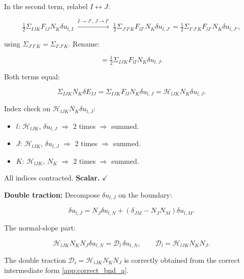 \documentclass[11pt]{article}
\begin{document}
In the second term, relabel $I\leftrightarrow J$:

\begin{equation}
\tfrac{1}{2}\Sigma_{IJK}F_{lJ}N_K\delta u_{l,I}
\;\xrightarrow{I\to J',\,J\to I'}\;
\tfrac{1}{2}\Sigma_{J'I'K}F_{lI'}N_K\delta u_{l,J'}
= \tfrac{1}{2}\Sigma_{I'J'K}F_{lI'}N_K\delta u_{l,J'},
\end{equation}

using $\Sigma_{J'I'K}=\Sigma_{I'J'K}$. Rename:

\begin{equation}
= \tfrac{1}{2}\Sigma_{IJK}F_{lI}N_K\delta u_{l,J}.
\end{equation}

Both terms equal:

\begin{equation}
\Sigma_{IJK}N_K\delta E_{IJ}
= \Sigma_{IJK}F_{lI}N_K\delta u_{l,J}
= \mathcal{H}_{lJK}N_K\delta u_{l,J}.
\label{app:correct_bnd_a}
\end{equation}

Index check on $\mathcal{H}_{lJK}N_K\delta u_{l,J}$:

\begin{itemize}
\item $l$: $\mathcal{H}_{lJK}$, $\delta u_{l,J}$ $\Rightarrow$ 2 times $\Rightarrow$ summed.
\item $J$: $\mathcal{H}_{lJK}$, $\delta u_{l,J}$ $\Rightarrow$ 2 times $\Rightarrow$ summed.
\item $K$: $\mathcal{H}_{lJK}$, $N_K$ $\Rightarrow$ 2 times $\Rightarrow$ summed.
\end{itemize}

All indices contracted. \textbf{Scalar.} $\checkmark$

\textbf{Double traction:} Decompose $\delta u_{l,J}$ on the boundary:

\begin{equation}
\delta u_{l,J} = N_J\delta u_{l,N} + (\delta_{JM}-N_JN_M)\delta u_{l,M}.
\end{equation}

The normal-slope part:

\begin{equation}
\mathcal{H}_{lJK}N_KN_J\delta u_{l,N}
= \mathcal{D}_l\,\delta u_{l,N},
\qquad
\mathcal{D}_l = \mathcal{H}_{lJK}N_KN_J.
\end{equation}

The double traction $\mathcal{D}_i=\mathcal{H}_{iJK}N_KN_J$ is correctly obtained from the correct intermediate form \eqref{app:correct_bnd_a}.
\end{document}

